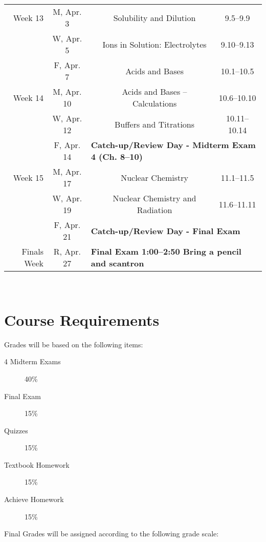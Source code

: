 \documentclass[12pt, letterpaper]{article}
\begin{document}
\begin{tabular}{rcccc}
	\midrule
	Week 13     & M, Apr. 3  &                                                                                & Solubility and Dilution              & 9.5--9.9     \\
	            & W, Apr. 5  &                                                                                & Ions in Solution: Electrolytes       & 9.10--9.13   \\
	            & F, Apr. 7  &                                                                                & Acids and Bases                      & 10.1--10.5   \\
	\midrule
	Week 14     & M, Apr. 10 &                                                                                & Acids and Bases -- Calculations      & 10.6--10.10  \\
	            & W, Apr. 12 &                                                                                & Buffers and Titrations               & 10.11--10.14 \\
	            & F, Apr. 14 & \multicolumn{3}{l}{\textbf{Catch-up/Review Day - Midterm Exam 4 (Ch. 8--10)}}                                                        \\
	\midrule
	Week 15     & M, Apr. 17 &                                                                                & Nuclear Chemistry                    & 11.1--11.5   \\
	            & W, Apr. 19 &                                                                                & Nuclear Chemistry and Radiation      & 11.6--11.11  \\
	            & F, Apr. 21 & \multicolumn{3}{l}{\textbf{Catch-up/Review Day - Final Exam}}                                                                        \\
	\midrule
	Finals Week & R, Apr. 27 & \multicolumn{3}{l}{\textbf{Final Exam 1:00--2:50 Bring a pencil and scantron}}                                                       \\
\end{tabular}
~

\section*{Course Requirements}
Grades will be based on the following items:
\begin{description}
	\item[4 Midterm Exams] 40\%
	\item[Final Exam] 15\%
	\item[Quizzes] 15\%
	\item[Textbook Homework] 15\%
	\item[Achieve Homework] 15\%
\end{description}
Final Grades will be assigned according to the following grade scale:
\end{document}
